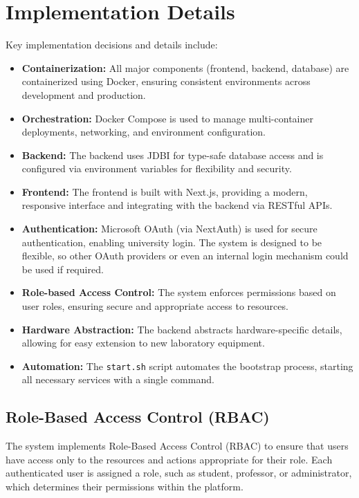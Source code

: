\section{Implementation Details}

Key implementation decisions and details include:

\begin{itemize}
    \item \textbf{Containerization:} All major components (frontend, backend, database) are containerized using Docker, ensuring consistent environments across development and production.
    \item \textbf{Orchestration:} Docker Compose is used to manage multi-container deployments, networking, and environment configuration.
    \item \textbf{Backend:} The backend uses JDBI for type-safe database access and is configured via environment variables for flexibility and security.
    \item \textbf{Frontend:} The frontend is built with Next.js, providing a modern, responsive interface and integrating with the backend via RESTful APIs.
    \item \textbf{Authentication:} Microsoft OAuth (via NextAuth) is used for secure authentication, enabling university login. The system is designed to be flexible, so other OAuth providers or even an internal login mechanism could be used if required.
    \item \textbf{Role-based Access Control:} The system enforces permissions based on user roles, ensuring secure and appropriate access to resources.
    \item \textbf{Hardware Abstraction:} The backend abstracts hardware-specific details, allowing for easy extension to new laboratory equipment.
    \item \textbf{Automation:} The \texttt{start.sh} script automates the bootstrap process, starting all necessary services with a single command.
\end{itemize}

\subsection*{Role-Based Access Control (RBAC)}

The system implements Role-Based Access Control (RBAC) to ensure that users have access only to the resources and actions appropriate for their role. Each authenticated user is assigned a role, such as student, professor, or administrator, which determines their permissions within the platform. 

